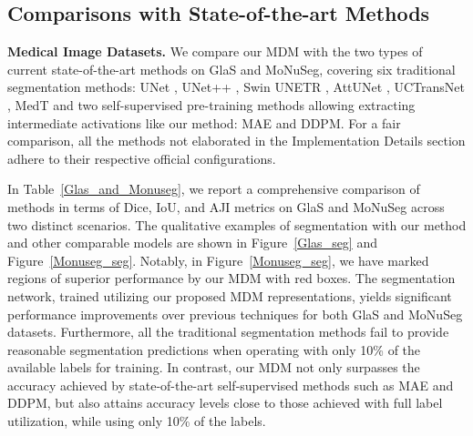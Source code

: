 \documentclass{article} \usepackage{iclr2024_conference,times}
\begin{document}
\subsection{Comparisons with State-of-the-art Methods}
\textbf{Medical Image Datasets.} We compare our MDM with the two types of current state-of-the-art methods on GlaS and MoNuSeg, covering six traditional segmentation methods: UNet \citep{DBLP:conf/miccai/RonnebergerFB15}, UNet++ \citep{DBLP:conf/miccai/ZhouSTL18}, Swin UNETR \citep{DBLP:conf/brainles-ws/HatamizadehNTYR21}, AttUNet \citep{10.1007/978-3-031-09002-8_27}, UCTransNet \citep{DBLP:conf/aaai/Wang0WZ22}, MedT \citep{DBLP:conf/miccai/ValanarasuOHP21} and two self-supervised pre-training methods allowing extracting intermediate activations like our method: MAE and DDPM. For a fair comparison, all the methods not elaborated in the Implementation Details section adhere to their respective official configurations.


In Table~\ref{Glas_and_Monuseg}, we report a comprehensive comparison of methods in terms of Dice, IoU, and AJI metrics on GlaS and MoNuSeg across two distinct scenarios. The qualitative examples of segmentation with our method and other comparable models are shown in Figure~\ref{Glas_seg} and Figure~\ref{Monuseg_seg}. 
Notably, in  Figure~\ref{Monuseg_seg}, we have marked regions of superior performance by our MDM with red boxes. The segmentation network, trained utilizing our proposed MDM representations, yields significant performance improvements over previous techniques for both GlaS and MoNuSeg datasets.  Furthermore, all the traditional segmentation methods fail to provide reasonable segmentation predictions when operating with only 10\% of the available labels for training. In contrast, our MDM not only surpasses the accuracy achieved by state-of-the-art self-supervised methods such as MAE and DDPM, but also attains accuracy levels close to those achieved with full label utilization, while using only 10\% of the labels.
\end{document}
